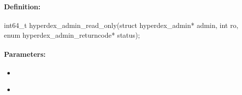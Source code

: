 %
%
%


\pagebreak
\subsubsection{}
\label{api:c:read_only}


\paragraph{Definition:}
\begin{ccode}
int64_t hyperdex_admin_read_only(struct hyperdex_admin* admin,
        int ro,
        enum hyperdex_admin_returncode* status);
\end{ccode}

\paragraph{Parameters:}
\begin{itemize}[noitemsep]
\item {}\\

\item {}\\

\end{itemize}

